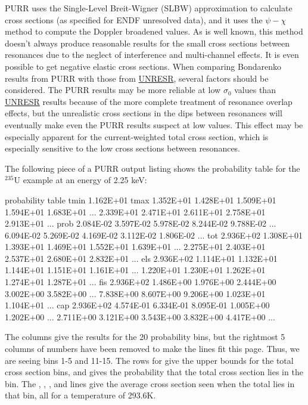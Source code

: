 PURR uses the Single-Level Breit-Wigner
(SLBW) approximation to calculate
cross sections (as specified for ENDF unresolved data), and it uses
the $\psi{-}\chi$ method
to compute the Doppler broadened values.
As is well known, this method doesn't always produce reasonable
results for the small cross sections between resonances due to the
neglect of interference and multi-channel effects.  It is even
possible to get negative elastic cross sections.  When comparing
Bondarenko results from PURR with those from
\hyperlink{sUNRESRhy}{UNRESR},
several factors should be considered.  The PURR results may be
more reliable at low $\sigma_0$ values than
\hyperlink{sUNRESRhy}{UNRESR} results because
of the more complete treatment of resonance overlap effects, but
the unrealistic cross sections in the dips between resonances will
eventually make even the PURR results suspect at low values.  This
effect may be especially apparent for the current-weighted
total cross section, which is especially sensitive to the
low cross sections between resonances.

The following piece of a PURR output listing shows the probability table
for the $^{235}$U example at an energy of 2.25 keV:

\newpage
\small
\begin{ccode}
 probability table
 tmin           1.162E+01
 tmax           1.352E+01  1.428E+01  1.509E+01  1.594E+01  1.683E+01 ...
                2.339E+01  2.471E+01  2.611E+01  2.758E+01  2.913E+01 ...
 prob           2.084E-02  3.597E-02  5.978E-02  8.244E-02  9.788E-02 ...
                6.094E-02  5.269E-02  4.169E-02  3.112E-02  1.806E-02 ...
 tot 2.936E+02  1.308E+01  1.393E+01  1.469E+01  1.552E+01  1.639E+01 ...
                2.275E+01  2.403E+01  2.537E+01  2.680E+01  2.832E+01 ...
 els 2.936E+02  1.114E+01  1.132E+01  1.144E+01  1.151E+01  1.161E+01 ...
                1.220E+01  1.230E+01  1.262E+01  1.274E+01  1.287E+01 ...
 fis 2.936E+02  1.486E+00  1.976E+00  2.444E+00  3.002E+00  3.582E+00 ...
                7.838E+00  8.607E+00  9.206E+00  1.023E+01  1.104E+01 ...
 cap 2.936E+02  4.574E-01  6.334E-01  8.095E-01  1.005E+00  1.202E+00 ...
                2.711E+00  3.121E+00  3.543E+00  3.832E+00  4.417E+00 ...

\end{ccode}
\normalsize

\noindent
The columns give the results for the 20 probability bins, but the
rightmost 5 columns of numbers have been removed to make the lines fit
this page.  Thus, we are seeing bins 1-5 and 11-15. The rows for
 give the upper bounds for the total cross section bins,
and  gives the probability that the total cross section
lies in the bin.  The , , , and
 lines give the average cross section seen when the
total lies in that bin, all for a temperature of 293.6K.

